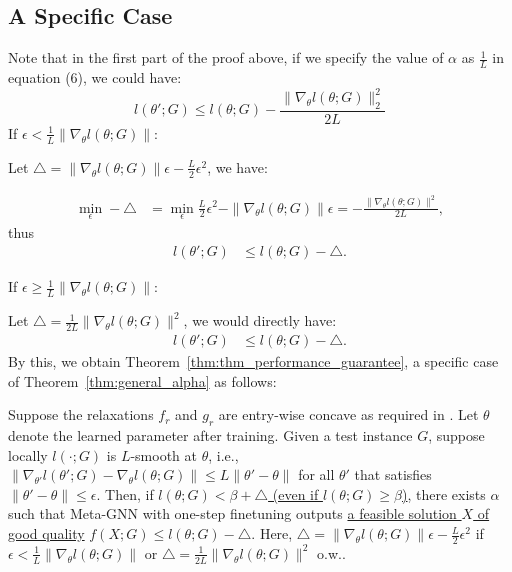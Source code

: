 \subsection{A Specific Case}
Note that in the first part of the proof above, if we specify the value of $\alpha$ as $\frac{1}{L}$ in equation (6), we could have:
\begin{equation}
    l(\theta';G) \leq l(\theta;G) -\frac{\|\nabla_{\theta}l(\theta;G)\|_2^2}{2L} 
\end{equation}
If $\epsilon< \frac{1}{L}\|\nabla_{\theta} l(\theta;G)\|$:

\qquad Let $\triangle = \|\nabla_{\theta}l(\theta;G)\| \epsilon - \frac{L}{2}\epsilon^2$, we have: 

\begin{equation}
\begin{aligned}
\min_{\epsilon} - \triangle & = \min_{\epsilon} \frac{L}{2} \epsilon^2 - \|\nabla_{\theta}l(\theta;G)\|\epsilon  = -\frac{\|\nabla_{\theta}l(\theta;G)\|^2}{2L},
\end{aligned}
\end{equation}
\qquad thus
\begin{equation}
\begin{aligned}
    l(\theta';G) &\leq l(\theta;G) - \triangle.
\end{aligned}
\end{equation}


If $\epsilon \geq \frac{1}{L}\|\nabla_{\theta} l(\theta;G)\|$:

\qquad Let $\triangle = \frac{1}{2L}\|\nabla_{\theta}l(\theta;G)\|^2$, we would directly have:
\begin{equation}
\begin{aligned}
    l(\theta';G) &\leq l(\theta;G) - \triangle.
\end{aligned}
\end{equation}
By this, we obtain Theorem~\ref{thm:thm_performance_guarantee}, a specific case of Theorem~\ref{thm:general_alpha} as follows:

\begin{theorem}
\label{thm:thm_performance_guarantee}
Suppose the relaxations $f_r$ and $g_r$ are entry-wise concave as required in \citep{wang2022unsupervised}. Let $\theta$ denote the learned parameter after training.  Given a test instance $G$, suppose locally $l(\cdot;G)$ is $L$-smooth at $\theta$, i.e., $\|\nabla_{\theta'} l(\theta';G) - \nabla_{\theta} l(\theta;G)\|\leq L\|\theta' - \theta\|$ for all $\theta'$ that satisfies $\|\theta' - \theta\|\leq \epsilon$. Then, if \underline{$l(\theta;G) < \beta + \triangle$ (even if $l(\theta;G) \geq \beta$)}, there exists $\alpha$ such that Meta-GNN with one-step finetuning outputs \underline{a feasible solution $X$ of good quality} $f(X;G)\leq l(\theta;G)-\triangle$. Here, $\triangle = \|\nabla_{\theta} l(\theta;G)\|\epsilon - \frac{L}{2}\epsilon^2$ if $\epsilon< \frac{1}{L}\|\nabla_{\theta} l(\theta;G)\|$ or $\triangle=\frac{1}{2L}\|\nabla_{\theta} l(\theta;G)\|^2$ o.w..
\end{theorem}


